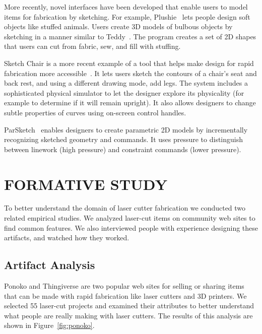 \documentclass{article}
\begin{document}
More recently, novel interfaces have been developed that enable users
to model items for fabrication by sketching. For example,
Plushie~\cite{mori-plushie} lets people design soft objects like
stuffed animals. Users create 3D models of bulbous objects by
sketching in a manner similar to Teddy~\cite{igarashi-teddy}. The
program creates a set of 2D shapes that users can cut from fabric,
sew, and fill with stuffing. 

Sketch Chair is a more recent example of a tool that helps make design
for rapid fabrication more accessible~\cite{saul-sketch-chair}. It
lets users sketch the contours of a chair's seat and back rest, and
using a different drawing mode, add legs. The system includes a
sophisticated physical simulator to let the designer explore its
physicality (for example to determine if it will remain upright). It
also allows designers to change subtle properties of curves using
on-screen control handles.

ParSketch~\cite{naya-parsketch} enables designers to create parametric
2D models by incrementally recognizing sketched geometry and
commands. It uses pressure to distinguish between linework (high
pressure) and constraint commands (lower pressure).

\section{FORMATIVE STUDY}

To better understand the domain of laser cutter fabrication we
conducted two related empirical studies. We analyzed laser-cut items
on community web sites to find common features. We also interviewed
people with experience designing these artifacts, and watched how they
worked. 

\subsection{Artifact Analysis}

Ponoko and Thingiverse are two popular web sites for selling or
sharing items that can be made with rapid fabrication like laser
cutters and 3D printers. We selected 55 laser-cut projects and
examined their attributes to better understand what people are really
making with laser cutters. The results of this analysis are shown in
Figure~\ref{fig:ponoko}.
\end{document}
